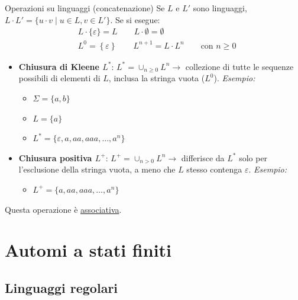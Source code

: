 \documentclass[12pt, a4paper]{report}
\begin{document}
            \begin{definitionbox}{Operazioni su linguaggi (concatenazione)}{}
                Se $L$ e $L'$ sono linguaggi, $L\cdot L'=\{u\cdot v\mid u\in L, v\in L'\}$. 
                Se si esegue: 
                \begin{equation*}
                    \begin{split}
                        &L\cdot \{\varepsilon\}=L \qquad L\cdot \emptyset = \emptyset \\
                        &L^0=\left\{\varepsilon\right\} \qquad L^{n+1}=L\cdot L^n \qquad \text{con } n\geq 0 
                    \end{split}
                \end{equation*}
                \begin{itemize}
                    \item \textbf{Chiusura di Kleene $L^*$}: $L^*=\cup_{n\geq 0}L^{n}\rightarrow$ collezione di tutte le sequenze possibili di elementi di $L$, inclusa la stringa vuota ($L^0$). 
                    \textit{Esempio:}
                    \begin{itemize}
                        \item $\Sigma=\{a,b\}$ 
                        \item $L=\{a\}$ 
                        \item $L^*=\{\varepsilon, a, aa, aaa, \ldots, a^n\}$ 
                    \end{itemize}
                    \item \textbf{Chiusura positiva $L^+$}: $L^+=\cup_{n>0}L^n\rightarrow$ differisce da $L^*$ solo per l'esclusione della stringa vuota, a meno che $L$ stesso contenga $\varepsilon$. 
                    \textit{Esempio:}
                    \begin{itemize}
                        \item $L^+=\{a, aa, aaa, \ldots, a^n\}$ 
                    \end{itemize}
                \end{itemize}
                Questa operazione è \underline{associativa}.
            \end{definitionbox}
    \chapter{Automi a stati finiti}
        \section{Linguaggi regolari}
\end{document}
